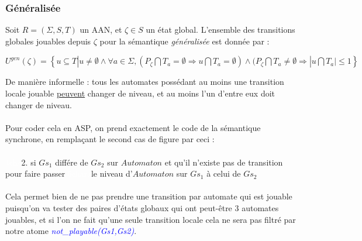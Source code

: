 \documentclass[12pt,a4paper]{article}
\begin{document}
\subsubsection{Généralisée}
Soit $R = (\Sigma,S,T)$ un AAN, et $\zeta\in S$ un état global. L'ensemble des transitions globales jouables depuis $\zeta$ pour la sémantique \emph{généralisée} est donnée par :
\begin{center}
	$U^{gen}(\zeta)=\left\{u\subseteq T|u \neq \emptyset \wedge \forall a\in\Sigma,(P_{\zeta}\bigcap T_a = \emptyset \Rightarrow u\bigcap 
	T_a=\emptyset)\wedge(P_{\zeta}\bigcap T_a\neq\emptyset\Rightarrow |u\bigcap T_a |\leq 1\right\}$
\end{center}
De manière informelle : tous les automates possédant au moins une transition locale jouable \underline{peuvent} changer de niveau, et au moins l'un d'entre eux doit changer de niveau.\\ \\
Pour coder cela en ASP, on prend exactement le code de la sémantique synchrone, en remplaçant le second cas de figure par ceci :\\ \\
\textcolor{white}{4cha}2. si $Gs_1$ différe de $Gs_2$ sur $Automaton$ et qu'il n'existe pas de transition pour faire passer 
\textcolor{white}{6chara}le niveau d'$Automaton$ sur $Gs_1$ à celui de $Gs_2$\\ \\
Cela permet bien de ne pas prendre une transition par automate qui est jouable puisqu'on va tester des paires d'états globaux qui ont peut-être 3 automates jouables, et si l'on ne fait qu'une seule transition locale cela ne sera pas 
filtré par notre atome \emph{\textcolor{blue}{not\_playable(Gs1,Gs2)}}.
\end{document}
